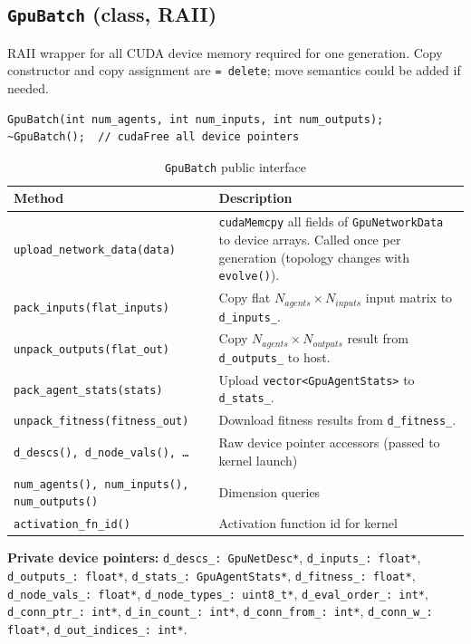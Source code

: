 \subsection{\texttt{GpuBatch} (class, RAII)}

RAII wrapper for all CUDA device memory required for one generation.  Copy constructor
and copy assignment are \texttt{= delete}; move semantics could be added if needed.

\begin{lstlisting}
GpuBatch(int num_agents, int num_inputs, int num_outputs);
~GpuBatch();  // cudaFree all device pointers
\end{lstlisting}

\begin{table}[H]
\centering\small
\caption{\texttt{GpuBatch} public interface}
\begin{tabularx}{\textwidth}{@{}lX@{}}
\toprule
\textbf{Method} & \textbf{Description} \\
\midrule
\texttt{upload\_network\_data(data)} &
  \texttt{cudaMemcpy} all fields of \texttt{GpuNetworkData} to device arrays.
  Called once per generation (topology changes with \texttt{evolve()}). \\
\texttt{pack\_inputs(flat\_inputs)} &
  Copy flat $N_{\mathit{agents}} \times N_{\mathit{inputs}}$ input matrix to
  \texttt{d\_inputs\_}. \\
\texttt{unpack\_outputs(flat\_out)} &
  Copy $N_{\mathit{agents}} \times N_{\mathit{outputs}}$ result from
  \texttt{d\_outputs\_} to host. \\
\texttt{pack\_agent\_stats(stats)} &
  Upload \texttt{vector<GpuAgentStats>} to \texttt{d\_stats\_}. \\
\texttt{unpack\_fitness(fitness\_out)} &
  Download fitness results from \texttt{d\_fitness\_}. \\
\texttt{d\_descs(), d\_node\_vals(), \ldots} & Raw device pointer accessors (passed to kernel launch) \\
\texttt{num\_agents(), num\_inputs(), num\_outputs()} & Dimension queries \\
\texttt{activation\_fn\_id()} & Activation function id for kernel \\
\bottomrule
\end{tabularx}
\end{table}

\textbf{Private device pointers:}
\texttt{d\_descs\_: GpuNetDesc*}, \texttt{d\_inputs\_: float*},
\texttt{d\_outputs\_: float*}, \texttt{d\_stats\_: GpuAgentStats*},
\texttt{d\_fitness\_: float*}, \texttt{d\_node\_vals\_: float*},
\texttt{d\_node\_types\_: uint8\_t*}, \texttt{d\_eval\_order\_: int*},
\texttt{d\_conn\_ptr\_: int*}, \texttt{d\_in\_count\_: int*},
\texttt{d\_conn\_from\_: int*}, \texttt{d\_conn\_w\_: float*},
\texttt{d\_out\_indices\_: int*}.

